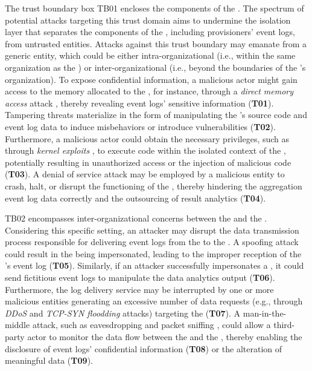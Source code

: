 \begin{newj}
The trust boundary box TB01 encloses the components of the . The spectrum of potential attacks targeting this trust domain aims to undermine the isolation layer that separates the components of the , including provisioners' event logs, from untrusted entities. Attacks against this trust boundary may emanate from a generic entity, which could be either intra-organizational (i.e., within the same organization as the ) or inter-organizational (i.e., beyond the boundaries of the 's organization). To expose confidential information, a malicious actor might gain access to the memory allocated to the , for instance, through a \textit{direct memory access} attack \cite{DBLP:conf/cms/EckertPK13}, thereby revealing event logs' sensitive information (\textbf{T01}). Tampering threats materialize in the form of manipulating the 's source code and event log data to induce misbehaviors or introduce vulnerabilities (\textbf{T02}). Furthermore, a malicious actor could obtain the necessary privileges, such as through \textit{kernel exploits} \cite{DBLP:conf/securecomm/XiaoHW15a}, to execute code within the isolated context of the , potentially resulting in unauthorized access or the injection of malicious code (\textbf{T03}). A denial of service attack may be employed by a malicious entity to crash, halt, or disrupt the functioning of the , thereby hindering the aggregation event log data correctly and the outsourcing of result analytics (\textbf{T04}). 

TB02  encompasses inter-organizational concerns between the  and the . Considering this specific setting, an attacker may disrupt the data transmission process responsible for delivering event logs from the  to the . A spoofing attack could result in the  being impersonated, leading to the improper reception of the 's event log (\textbf{T05}). Similarly, if an attacker successfully impersonates a , it could send fictitious event logs to manipulate the data analytics output (\textbf{T06}). Furthermore, the log delivery service may be interrupted by one or more malicious entities generating an excessive number of data requests (e.g., through \textit{DDoS} \cite{DBLP:journals/ijdsn/MahjabinXSJ17} and \textit{TCP-SYN floodding} \cite{DBLP:journals/wpc/SwamiDR21} attacks) targeting the  (\textbf{T07}). A man-in-the-middle attack, such as eavesdropping and packet sniffing \cite{DBLP:journals/jocs/LiXDZCW15}, could allow a third-party actor to monitor the data flow between the  and the , thereby enabling the disclosure of event logs' confidential information (\textbf{T08}) or the alteration of meaningful data (\textbf{T09}).


\end{newj}
